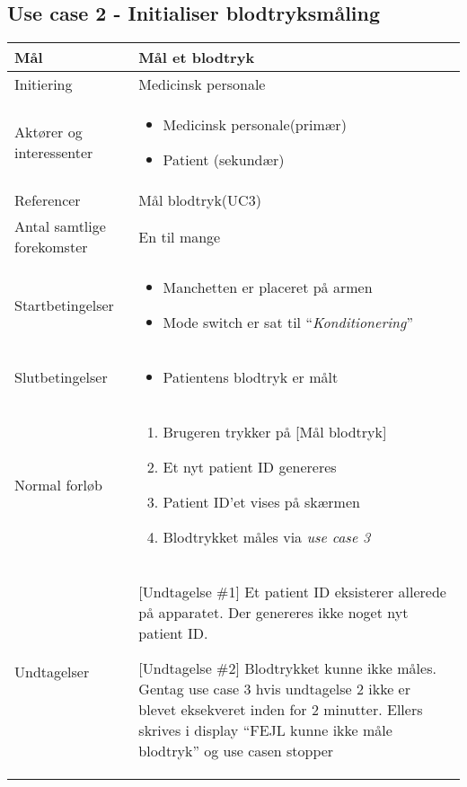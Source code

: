 	\subsection{Use case 2 - Initialiser blodtryksmåling }
		\begin{center}
			\begin{tabular}{ | p{} | p{}| } 
				\hline
				Mål& Mål et blodtryk\\ 
				\hline
				Initiering &  Medicinsk personale\\
				\hline
				Aktører og interessenter & 
				\begin{itemize}
					\item Medicinsk personale(primær)
					\item Patient (sekundær)
				\end{itemize} \\ 
				\hline
				Referencer & Mål blodtryk(UC3) \\ 
				\hline
				Antal samtlige forekomster & En til mange\\ 
				\hline	
				Startbetingelser & 
				\begin{itemize}
					\item Manchetten er placeret på armen
					\item Mode switch er sat til “\textit{Konditionering}”
				\end{itemize} \\ 
				\hline
				Slutbetingelser & 
				\begin{itemize}
					\item Patientens blodtryk er målt
				\end{itemize} \\ 
				\hline
				Normal forløb & \begin{enumerate}
					\setlength\itemsep{0cm} %
					\item Brugeren trykker på [Mål blodtryk]
					\item Et nyt patient ID genereres
					\subitem [Undtagelse \#1] 
					\item Patient ID’et vises på skærmen
					\item Blodtrykket måles via \textit{use case 3}
					\subitem [Undtagelse \#2]
				\end{enumerate} \\ 
				\hline
				Undtagelser &  [Undtagelse \#1] Et patient ID eksisterer allerede på apparatet. Der genereres ikke noget nyt patient ID.
				
				[Undtagelse \#2] Blodtrykket kunne ikke måles. Gentag use case 3 hvis undtagelse 2 ikke er blevet eksekveret inden for 2 minutter. Ellers skrives i display “FEJL kunne ikke måle blodtryk” og use casen stopper\\ 
				\hline
			\end{tabular}
		\end{center}
		\pagebreak